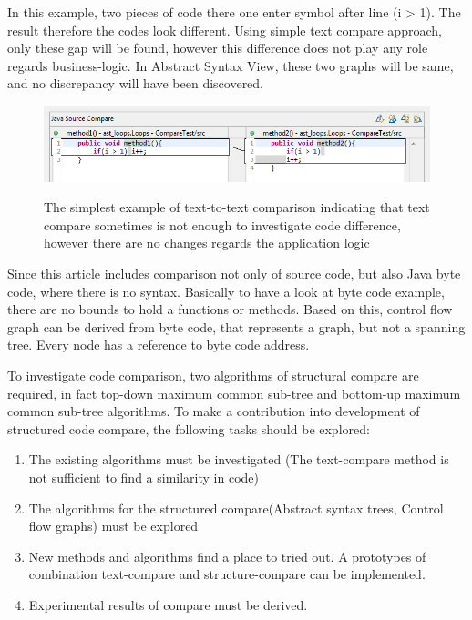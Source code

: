 \documentclass{report}
\begin{document}
In this example, two pieces of code there one enter symbol after line (i > 1). The result therefore the codes look different. Using simple text compare approach, only these gap will be found, however this difference does not play any role regards business-logic. In Abstract Syntax View, these two graphs will be same, and no discrepancy will have been discovered.
\begin{figure}[h]
  \centering
  \includegraphics[scale=0.6]{Figures/introduction/intro-code-example}\\[0.1cm]
  \caption[Text to text comparison example]{The simplest example of text-to-text comparison indicating that text compare sometimes is not enough to investigate code difference, however there are no changes regards the application logic}
  \label{fig:intro-code-example}
\end{figure}

	
Since this article includes comparison not only of source code, but also Java byte code, where there is no syntax. Basically to have a look at byte code example, there are no bounds to hold a functions or methods. Based on this, control flow graph can be derived from byte code, that represents a graph, but not a spanning tree. Every node has a reference to byte code address.




To investigate code comparison, two algorithms of structural compare are required, in fact top-down maximum common sub-tree and bottom-up maximum common sub-tree algorithms. To make a contribution into development of structured code compare, the following tasks should be explored:

\begin{enumerate}
  \item The existing algorithms must be investigated (The text-compare method is not sufficient to find a similarity in code)
  \item The algorithms for the structured compare(Abstract syntax trees, Control flow graphs) must be explored 
  \item New methods and algorithms find a place to tried out. A prototypes of combination text-compare and structure-compare can be implemented.
  \item Experimental results of compare must be derived.
\end{enumerate}
\end{document}
